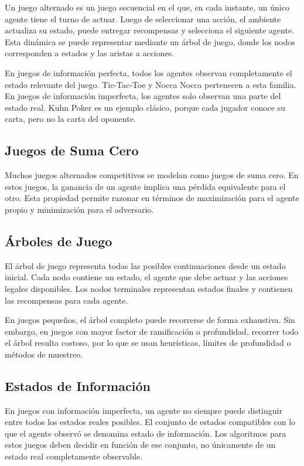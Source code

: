 \documentclass[letterpaper,12pt]{article}
\begin{document}
Un juego alternado es un juego secuencial en el que, en cada instante, un único agente tiene el turno de actuar. Luego de seleccionar una acción, el ambiente actualiza su estado, puede entregar recompensas y selecciona el siguiente agente. Esta dinámica se puede representar mediante un árbol de juego, donde los nodos corresponden a estados y las aristas a acciones.

En juegos de información perfecta, todos los agentes observan completamente el estado relevante del juego. Tic-Tac-Toe y Nocca Nocca pertenecen a esta familia. En juegos de información imperfecta, los agentes solo observan una parte del estado real. Kuhn Poker es un ejemplo clásico, porque cada jugador conoce su carta, pero no la carta del oponente.

\subsection{Juegos de Suma Cero}

Muchos juegos alternados competitivos se modelan como juegos de suma cero. En estos juegos, la ganancia de un agente implica una pérdida equivalente para el otro. Esta propiedad permite razonar en términos de maximización para el agente propio y minimización para el adversario.

\subsection{Árboles de Juego}

El árbol de juego representa todas las posibles continuaciones desde un estado inicial. Cada nodo contiene un estado, el agente que debe actuar y las acciones legales disponibles. Los nodos terminales representan estados finales y contienen las recompensas para cada agente.

En juegos pequeños, el árbol completo puede recorrerse de forma exhaustiva. Sin embargo, en juegos con mayor factor de ramificación o profundidad, recorrer todo el árbol resulta costoso, por lo que se usan heurísticas, límites de profundidad o métodos de muestreo.

\subsection{Estados de Información}

En juegos con información imperfecta, un agente no siempre puede distinguir entre todos los estados reales posibles. El conjunto de estados compatibles con lo que el agente observó se denomina estado de información. Los algoritmos para estos juegos deben decidir en función de ese conjunto, no únicamente de un estado real completamente observable.
\end{document}
